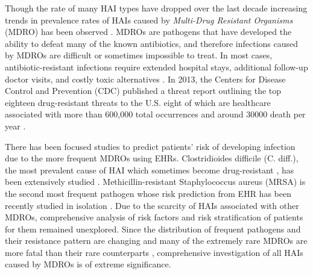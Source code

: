 
Though the rate of many HAI types have dropped over the last decade \cite{progress} increasing trends in prevalence rates of HAIs caused by \emph{Multi-Drug Resistant Organisms} (MDRO) has been observed \cite{balkhair2014epidemiology, actionplan}. MDROs are pathogens that have developed the ability to defeat many of the known antibiotics, and therefore infections caused by MDROs are difficult or sometimes impossible to treat. In most cases, antibiotic-resistant infections require extended hospital stays, additional follow-up doctor visits, and costly toxic alternatives \cite{amr, resistance}. In 2013, the Centers for Disease Control and Prevention (CDC) published a threat report outlining the top eighteen drug-resistant threats to the U.S. eight of which are healthcare associated with more than 600,000 total occurrences and around 30000 death per year \cite{resistance}. 


There has been focused studies to predict patients' risk of developing infection due to the more frequent MDROs using EHRs. Clostridioides difficile (C. diff.), the most prevalent cause of HAI which sometimes become drug-resistant \cite{peng2017update}, has been extensively studied \cite{oh2018generalizable, wiens2012learning, wiens2014learning, wiens2012patient}.  Methicillin-resistant Staphylococcus aureus (MRSA) is the second most frequent pathogen whose risk prediction from EHR has been recently studied in isolation \cite{hartvigsen2018early}. Due to the scarcity of HAIs associated with other MDROs, comprehensive analysis of risk factors and risk stratification of patients for them remained unexplored. Since the distribution of frequent pathogens and their resistance pattern are changing \cite{weiner2016antimicrobial} and many of the extremely rare MDROs are more fatal than their rare counterparts \cite{resistance}, comprehensive investigation of all HAIs caused by MDROs is of extreme significance. 

